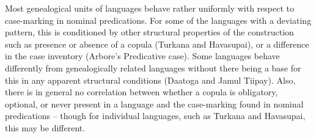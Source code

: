 Most genealogical units of languages behave rather uniformly with respect to case-marking in nominal predications. 
For some of the languages with a deviating pattern, this is conditioned by other structural properties of the construction such as presence or absence of a copula (Turkana and Havasupai), or a difference in the case inventory (Arbore's Predicative case). 
Some languages behave differently from genealogically related languages without there being a base for this in any apparent structural conditions (Daatoga and Jamul Tiipay). 
Also, there is in general no correlation between whether a copula is obligatory, optional, or never present in a language and the case-marking found in nominal predications -- though for individual languages, such as Turkana and Havasupai, this may be different.  

